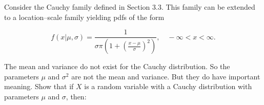 \documentclass[12pt,letterpaper]{exam}
\begin{document}
\begin{questions}
	\question 
	Consider the Cauchy family defined in Section 3.3. This family can be extended to a
	location–scale family yielding pdfs of the form
	
	\[f(x|\mu,\sigma) = \frac{1}{\sigma\pi \left(1 + \left(\frac{x-\mu}{\sigma}\right)^2 \right)} ,\quad -\infty<x<\infty.\]
	
	The mean and variance do not exist for the Cauchy distribution. So the parameters
	\(\mu\) and \(\sigma^2\) are not the mean and variance. But they do have important meaning. Show
	that if \(X\) is a random variable with a Cauchy distribution with parameters \(\mu\) and \(\sigma\),
	then:
	
	\clearpage
	
	\begin{solution}
\end{solution}
\end{questions}
\end{document}

